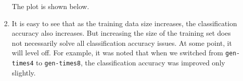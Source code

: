 \documentclass[11pt]{article}
\begin{document}
\begin{enumerate}
\begin{enumerate}[label=(\alph*)]
		The plot is shown below.

		\begin{figure}[htb]
		\end{figure}

	\newpage
	\item %
		It is easy to see that as the training data size increases, the classification accuracy also increases. But increasing the size of the training set does not necessarily solve all classification accuracy issues. At some point, it will level off. For example, it was noted that when we switched from \texttt{gen-times4} to \texttt{gen-times8}, the classification accuracy was improved only slightly.


\end{enumerate}
\end{enumerate}
\end{document}
